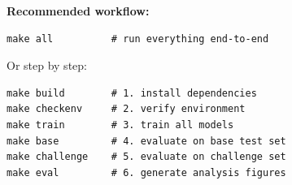 \documentclass[11pt,a4paper]{article}
\begin{document}
\noindent \textbf{Recommended workflow:}
\begin{verbatim}
make all          # run everything end-to-end
\end{verbatim}

\noindent Or step by step:
\begin{verbatim}
make build        # 1. install dependencies
make checkenv     # 2. verify environment
make train        # 3. train all models
make base         # 4. evaluate on base test set
make challenge    # 5. evaluate on challenge set
make eval         # 6. generate analysis figures
\end{verbatim}
\end{document}
